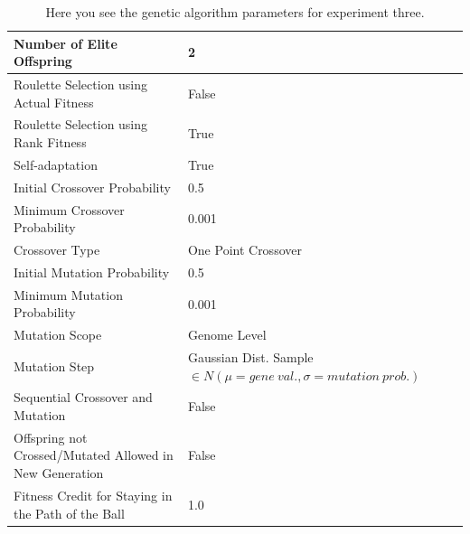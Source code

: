 \documentclass[a4paper,10pt]{article}
\begin{document}
\begin{table}[H]
\footnotesize
\begin{tabular}{ >{\columncolor[gray]{0.8}} l | l }
\hline
Number of Elite Offspring                                            & 2                                                                            \\ \hline
Roulette Selection using Actual Fitness                              & False                                                                        \\ \hline
Roulette Selection using Rank Fitness                                & True                                                                         \\ \hline
Self-adaptation                                                      & True                                                                         \\ \hline
Initial Crossover Probability                                        & 0.5                                                                          \\ \hline
Minimum Crossover Probability                                        & 0.001                                                                        \\ \hline
Crossover Type                                                       & One Point Crossover                                                          \\ \hline
Initial Mutation Probability                                         & 0.5                                                                          \\ \hline
Minimum Mutation Probability                                         & 0.001                                                                        \\ \hline
Mutation Scope                                                       & Genome Level                                                                 \\ \hline
Mutation Step                                                        & Gaussian Dist. Sample $\in N(\mu=gene \ val., \sigma = mutation \ prob.)$    \\ \hline
Sequential Crossover and Mutation                                    & False                                                      	            \\ \hline
Offspring not Crossed/Mutated Allowed in New Generation              & False                                                     	            \\ \hline
Fitness Credit for Staying in the Path of the Ball                   & 1.0                                                      	            \\ \hline
\end{tabular}
\caption{Here you see the genetic algorithm parameters for experiment three.}
\label{tab:exp3}
\end{table}
\end{document}
